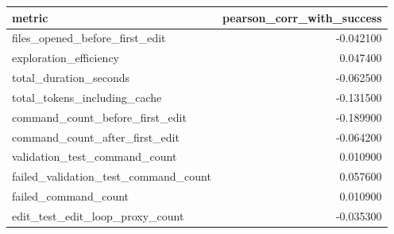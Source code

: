 \begin{tabular}{lr}
\toprule
metric & pearson\_corr\_with\_success \\
\midrule
files\_opened\_before\_first\_edit & -0.042100 \\
exploration\_efficiency & 0.047400 \\
total\_duration\_seconds & -0.062500 \\
total\_tokens\_including\_cache & -0.131500 \\
command\_count\_before\_first\_edit & -0.189900 \\
command\_count\_after\_first\_edit & -0.064200 \\
validation\_test\_command\_count & 0.010900 \\
failed\_validation\_test\_command\_count & 0.057600 \\
failed\_command\_count & 0.010900 \\
edit\_test\_edit\_loop\_proxy\_count & -0.035300 \\
\bottomrule
\end{tabular}
